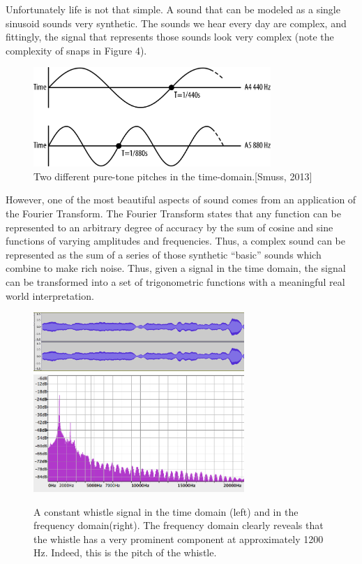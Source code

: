 \documentclass[DIV=calc, paper=a4, fontsize=11pt, twocolumn]{scrartcl}   %
\begin{document}
\par Unfortunately life is not that simple. A sound that can be modeled as a single sinusoid sounds very synthetic. The sounds we hear every day are complex, and fittingly, the signal that represents those sounds look very complex (note the complexity of snaps in Figure 4).

\begin{figure}[h]
\centering
\includegraphics[width=90mm]{figures/PitchGraph.png}
\caption{Two different pure-tone pitches in the time-domain.[Smuss, 2013]}
\label{overflow}
\end{figure}

  However, one of the most beautiful aspects of sound comes from an application of the Fourier Transform. The Fourier Transform states that any function can be represented to an arbitrary degree of accuracy by the sum of cosine and sine functions of varying amplitudes and frequencies. Thus, a complex sound can be represented as the sum of a series of those synthetic ``basic'' sounds which combine to make rich noise. Thus, given a signal in the time domain, the signal can be transformed into a set of trigonometric functions with a meaningful real world interpretation.

\begin{figure}[h]
\centering
\includegraphics[width=80mm]{figures/whistletimedomain.png}
\includegraphics[width=80mm]{figures/frequencydomainwhistle.png}
\caption{A constant whistle signal in the time domain (left) and in the frequency domain(right). The frequency domain clearly reveals that the whistle has a very prominent component at approximately 1200 Hz. Indeed, this is the pitch of the whistle. }
\label{overflow}
\end{figure}
\end{document}
